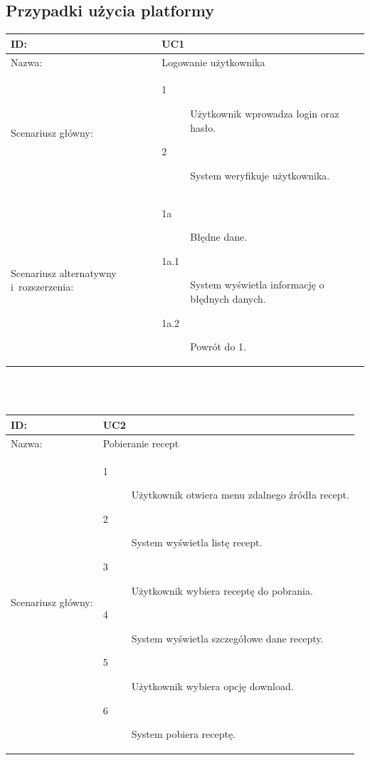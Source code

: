 \documentclass[11pt,a4paper,polish,thesis]{dcsbook}
\begin{document}
\subsection{Przypadki użycia platformy}
\begin{tabular}{|p{2.5cm}|p{11.5cm}|}  \hline ID: &
UC1
\\ \hline Nazwa: &
Logowanie użytkownika
\\ \hline Scenariusz główny: &
\begin{description}
\item[1] Użytkownik wprowadza login oraz hasło.
\item[2] System weryfikuje użytkownika.
\end{description}
\\ \hline Scenariusz alternatywny i~rozszerzenia: &
\begin{description}
\item[1a] Błędne dane.
\item[1a.1] System wyświetla informację o błędnych danych.
\item[1a.2] Powrót do 1.
\end{description}
\\ \hline \end{tabular}
\\\\ \begin{tabular}{|p{2.5cm}|p{11.5cm}|}  \hline ID: &
UC2
\\ \hline Nazwa: &
Pobieranie recept
\\ \hline Scenariusz główny: &
\begin{description}
\item[1] Użytkownik otwiera menu zdalnego źródła recept.
\item[2] System wyświetla listę recept.
\item[3] Użytkownik wybiera receptę do pobrania.
\item[4] System wyświetla szczegółowe dane recepty.
\item[5] Użytkownik wybiera opcję download.
\item[6] System pobiera receptę.
\end{description}
\\ \hline \end{tabular}
\end{document}
